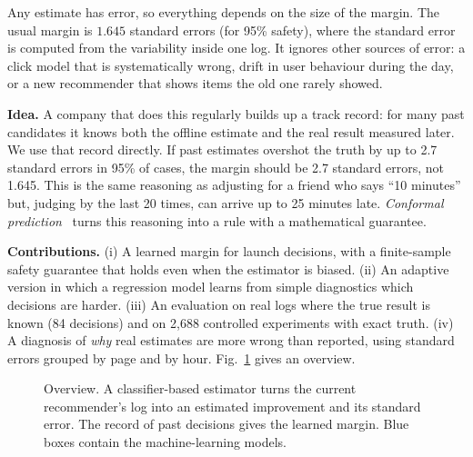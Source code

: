 \documentclass[conference]{IEEEtran}
\begin{document}
Any estimate has error, so everything depends on the size of the margin. The usual margin is $1.645$ standard errors (for 95\% safety), where the standard error is computed from the variability inside one log. It ignores other sources of error: a click model that is systematically wrong, drift in user behaviour during the day, or a new recommender that shows items the old one rarely showed.

\textbf{Idea.} A company that does this regularly builds up a track record: for many past candidates it knows both the offline estimate and the real result measured later. We use that record directly. If past estimates overshot the truth by up to 2.7 standard errors in 95\% of cases, the margin should be 2.7 standard errors, not 1.645. This is the same reasoning as adjusting for a friend who says ``10 minutes'' but, judging by the last 20 times, can arrive up to 25 minutes late. \emph{Conformal prediction}~\cite{vovk2005alrw,angelopoulos2023gentle} turns this reasoning into a rule with a mathematical guarantee.

\textbf{Contributions.} (i) A learned margin for launch decisions, with a finite-sample safety guarantee that holds even when the estimator is biased. (ii) An adaptive version in which a regression model learns from simple diagnostics which decisions are harder. (iii) An evaluation on real logs where the true result is known (84 decisions) and on 2{,}688 controlled experiments with exact truth. (iv) A diagnosis of \emph{why} real estimates are more wrong than reported, using standard errors grouped by page and by hour. Fig.~\ref{fig:pipeline} gives an overview.

\begin{figure}[t]
\centering

\caption{Overview. A classifier-based estimator turns the current recommender's log into an estimated improvement and its standard error. The record of past decisions gives the learned margin. Blue boxes contain the machine-learning models.}
\label{fig:pipeline}
\end{figure}
\end{document}
